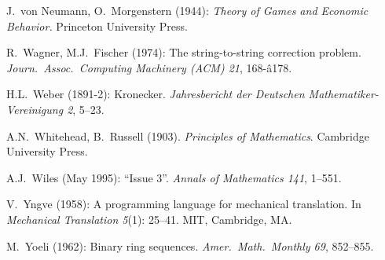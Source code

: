 \begin{thebibliography}{999}



J.~von Neumann, O.~Morgenstern (1944):
{\it Theory of Games and Economic Behavior.}
Princeton University Press.


R.~Wagner, M.J.~Fischer (1974):
The string-to-string correction problem.
{\it Journ.~Assoc.~Computing Machinery (ACM) 21}, 168-â178.

H.L.~Weber (1891-2): Kronecker.
{\it Jahresbericht der Deutschen Mathematiker-Vereinigung 2}, 5--23.

A.N.~Whitehead, B.~Russell (1903).  {\it Principles of Mathematics}.
Cambridge University Press. 

A.J.~Wiles (May 1995): ``Issue 3''.  {\it Annals of Mathematics 141}, 1--551.



V.~Yngve (1958): 
A programming language for mechanical translation.
In {\it Mechanical Translation 5}(1): 25--41.  MIT, Cambridge, MA.

M.~Yoeli (1962): Binary ring sequences.  {\it Amer.~Math.~Monthly 69},
852--855.



\end{thebibliography}

